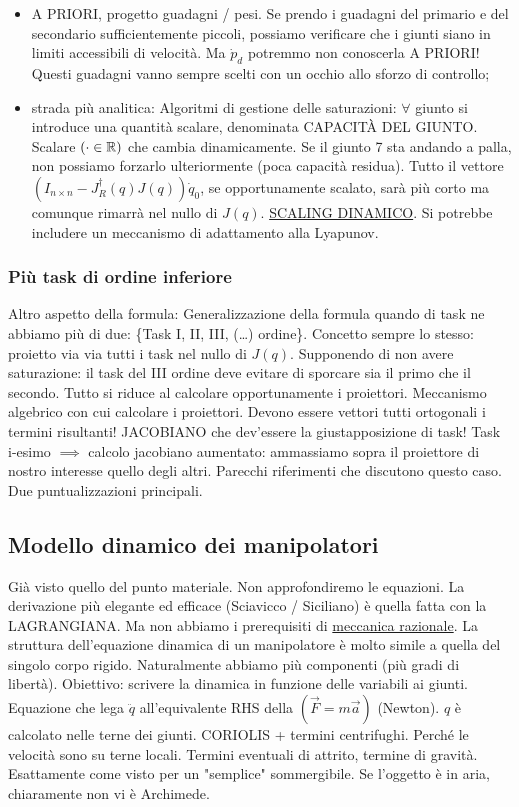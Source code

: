 \begin{itemize}

\item A PRIORI, progetto guadagni / pesi. Se prendo i guadagni del primario e del secondario sufficientemente piccoli, possiamo verificare che i giunti siano in limiti accessibili di velocità. Ma $\dot{p}_d$ potremmo non conoscerla A PRIORI! Questi guadagni vanno sempre scelti con un occhio allo sforzo di controllo;

\item strada più analitica: Algoritmi di gestione delle saturazioni: $\forall$ giunto si introduce una quantità scalare, denominata CAPACIT\`A DEL GIUNTO. Scalare $(\mathord{\cdot}\in\mathbb{R})$ che cambia dinamicamente. Se il giunto 7 sta andando a palla, non possiamo forzarlo ulteriormente (poca capacità residua). Tutto il vettore $(I_{n\times n}-J^\dag_R(q)J(q))\dot{q}_0$, se opportunamente scalato, sarà più corto ma comunque rimarrà nel nullo di $J(q)$. \underline{SCALING DINAMICO}. Si potrebbe includere un meccanismo di adattamento alla Lyapunov.

\end{itemize}

\subsubsection{Più task di ordine inferiore}

Altro aspetto della formula: Generalizzazione della formula quando di task ne abbiamo più di due: \{Task I, II, III, (\dots) ordine\}. Concetto sempre lo stesso: proietto via via tutti i task nel nullo di $J(q)$. Supponendo di non avere saturazione: il task del III ordine deve evitare di sporcare sia il primo che il secondo. Tutto si riduce al calcolare opportunamente i proiettori. Meccanismo algebrico con cui calcolare i proiettori. Devono essere vettori tutti ortogonali i termini risultanti! JACOBIANO che dev'essere la giustapposizione di task! Task i-esimo $\implies$ calcolo jacobiano aumentato: ammassiamo sopra il proiettore di nostro interesse quello degli altri. Parecchi riferimenti che discutono questo caso. Due puntualizzazioni principali.

\subsection{Modello dinamico dei manipolatori}


Già visto quello del punto materiale. Non approfondiremo le equazioni. La derivazione più elegante ed efficace (Sciavicco / Siciliano) è quella fatta con la LAGRANGIANA. Ma non abbiamo i prerequisiti di \underline{meccanica razionale}. La struttura dell'equazione dinamica di un manipolatore è molto simile a quella del singolo corpo rigido. Naturalmente abbiamo più componenti (più gradi di libertà). Obiettivo: scrivere la dinamica in funzione delle variabili ai giunti. Equazione che lega $\ddot{q}$ all'equivalente RHS della $(\vec{F}=m\vec{a})$ (Newton). $q$ è calcolato nelle terne dei giunti. CORIOLIS + termini centrifughi. Perché le velocità sono su terne locali. Termini eventuali di attrito, termine di gravità. Esattamente come visto per un "semplice" sommergibile. Se l'oggetto è in aria, chiaramente non vi è Archimede.

